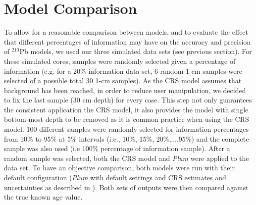 \documentclass [10pt] {article}
\begin{document}

\section{Model Comparison}

To allow for a reasonable comparison between models, and to evaluate the effect that different percentages of information may have on the accuracy and precision of $^{210}$Pb models, we used our three simulated data sets (see previous section). 
For these simulated cores, samples were randomly selected given a percentage of information (e.g. for a 20\% information data set, 6 random 1-cm samples were selected of a possible total 30 1-cm samples). 
As the CRS model assumes that background has been reached, in order to reduce user manipulation, we decided to fix the last sample (30 cm depth) for every case.
This step not only guarantees the consistent application the CRS model, it also provides the model with single bottom-most depth to be removed as it is common practice when using the CRS model.
100 different samples were randomly selected for information percentages from 10\% to 95\% at 5\% intervals (i.e., 10\%, 15\%, 20\%,...,95\%) and the complete sample was also used (i.e 100\% percentage of information sample).
After a random sample was selected, both the CRS model and \textit{Plum} were applied to the data set.  
To have an objective comparison, both models were run with their default configuration (\textit{Plum} with default settings and CRS estimates and uncertainties as described in \citet{Appleby2001}). 
Both sets of outputs were then compared against the true known age value.
\end{document}
